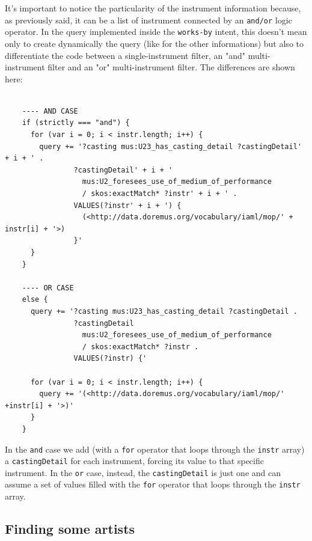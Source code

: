 \documentclass[a4paper,12pt]{report}
\begin{document}
	It's important to notice the particularity of the instrument information because, as previously said, it can be a list of instrument connected by an \texttt{and/or} logic operator. In the query implemented inside the \texttt{works-by} intent, this doesn't mean only to create dynamically the query (like for the other informations) but also to differentiate the code between a single-instrument filter, an "and" multi-instrument filter and an "or" multi-instrument filter. The differences are shown here:
	\begin{lstlisting}
	
	---- AND CASE
	if (strictly === "and") {
	  for (var i = 0; i < instr.length; i++) {
	    query += '?casting mus:U23_has_casting_detail ?castingDetail' + i + ' .
	            ?castingDetail' + i + '
	              mus:U2_foresees_use_of_medium_of_performance
	              / skos:exactMatch* ?instr' + i + ' .
	            VALUES(?instr' + i + ') {
	              (<http://data.doremus.org/vocabulary/iaml/mop/' + instr[i] + '>)
	            }'
	  }
	}
	
	---- OR CASE
	else {
	  query += '?casting mus:U23_has_casting_detail ?castingDetail .
	            ?castingDetail
	              mus:U2_foresees_use_of_medium_of_performance
	              / skos:exactMatch* ?instr .
	            VALUES(?instr) {'
	
	  for (var i = 0; i < instr.length; i++) {
	    query += '(<http://data.doremus.org/vocabulary/iaml/mop/' +instr[i] + '>)'
	  }
	}
	\end{lstlisting}
	In the \texttt{and} case we add (with a \texttt{for} operator that loops through the \texttt{instr} array) a \texttt{castingDetail} for each instrument, forcing its value to that specific instrument. In the \texttt{or} case, instead, the \texttt{castingDetail} is just one and can assume a set of values filled with the \texttt{for} operator that loops through the \texttt{instr} array. 

	\subsection{Finding some artists}
\end{document}
